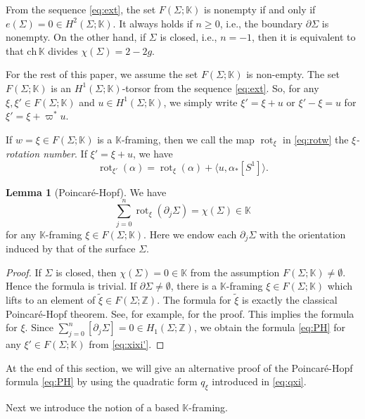 \documentclass[a4paper,12pt, twoside]{amsart}
\theoremstyle{definition}
\newtheorem{lem}[dfn]{Lemma}
\theoremstyle{remark}
\numberwithin{equation}{section}
\newcommand\bK{{\mathbb{K}}}
\newcommand\bZ{{\mathbb{Z}}}
\newcommand\ch{\mathrm{ch}\,}
\newcommand\pa{\partial}
\newcommand\rot{\operatorname{rot}}
\begin{document}
From the sequence \eqref{eq:ext}, the set $F(\Sigma; \bK)$ is nonempty if and only if $e(\Sigma)=0\in H^2(\Sigma;\bK)$. 
It always holds if $n \geq 0$, i.e., the boundary $\pa\Sigma$ is nonempty. On the other hand, if $\Sigma$ is closed, i.e., $n=-1$, then it is equivalent to that $\ch\bK$ divides $\chi(\Sigma) = 2-2g$.\par

For the rest of this paper, we assume the set $F(\Sigma; \bK)$ is non-empty. The set $F(\Sigma; \bK)$ is an $H^1(\Sigma; \bK)$-torsor from the sequence \eqref{eq:ext}. So, for any $\xi, \xi' \in F(\Sigma; \bK)$ and  $u \in H^1(\Sigma; \bK)$, 
we simply write $\xi' = \xi + u$ or $\xi' - \xi = u$ for $\xi' = \xi + \varpi^*u$. \par

If $w = \xi \in F(\Sigma; \bK)$ is a $\bK$-framing, then we call the map $\rot_\xi$ in \eqref{eq:rotw} the {\it $\xi$-rotation number}. If $\xi' = \xi + u$, we have
\begin{equation}\label{eq:xixi'}
\rot_{\xi'}(\alpha) = \rot_\xi(\alpha) + \langle u, \alpha_*[S^1]\rangle.
\end{equation}
\begin{lem}[Poincar\'e-Hopf]\label{lem:PH}
We have 
\begin{equation}\label{eq:PH}
{\sum}^n_{j=0}\rot_\xi(\pa_j\Sigma) = \chi(\Sigma) \in \bK
\end{equation}
for any $\bK$-framing $\xi \in F(\Sigma; \bK)$. 
Here we endow each $\pa_j\Sigma$ with the orientation induced by that of the surface $\Sigma$.
\end{lem}
\begin{proof}
If $\Sigma$ is closed, then $\chi(\Sigma) = 0 \in \bK$ from the assumption $F(\Sigma; \bK) \neq \emptyset$. Hence the formula is trivial. 
If $\pa\Sigma \neq \emptyset$, there is a $\bK$-framing $\xi \in F(\Sigma; \bK)$ which lifts to an element of $\tilde\xi \in F(\Sigma; \bZ)$.
The formula for $\tilde\xi$ is exactly the classical Poincar\'e-Hopf theorem.
See, for example, \cite[Lemma 3.3]{Kaw18} for the proof. 
This implies the formula for $\xi$. Since $\sum^n_{j=0}[\pa_j\Sigma] =0 \in H_1(\Sigma; \bZ)$, we obtain the formula \eqref{eq:PH} for any $\xi' \in F(\Sigma; \bK)$ from \eqref{eq:xixi'}.
\end{proof}
At the end of this section, we will give an alternative proof of the Poincar\'e-Hopf formula \eqref{eq:PH} by using the quadratic form $q_\xi$ introduced in \eqref{eq:qxi}. 
\par
\medskip
Next we introduce the notion of a based $\bK$-framing.
\end{document}
